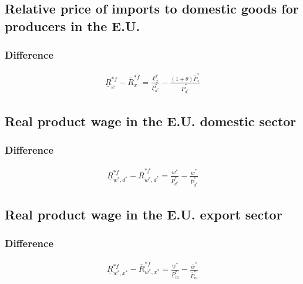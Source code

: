 \subsection*{Relative price of imports to domestic goods for producers in the E.U.}

\subsubsection*{Difference}
\begin{equation}\label{xproeu.diff}
\begin{aligned}
\underline R^{*f}_x - \overline R^{*f}_x = \frac{\underline P^*_x}{\underline P^*_{d^*}} - \frac{ \left( 1+\theta \right) \overline P^*_x}{\overline P^*_{d^*}}
\end{aligned}  
\end{equation}


\subsection*{Real product wage in the E.U. domestic sector}

\subsubsection*{Difference}
\begin{equation}\label{prodweu.diff} 
\begin{aligned}
\underline R^{*f}_{w^*, d^*} - \overline R^{*f}_{w^*, d^*} = \frac{\underline w^*}{\underline P^*_{d^*}} - \frac{\overline w^*}{\overline P^*_{d^*}}
\end{aligned}  
\end{equation}

\subsection*{Real product wage in the E.U. export sector}

\subsubsection*{Difference}
\begin{equation}\label{proxweu.diff}  
\begin{aligned}
\underline R^{*f}_{w^*, x^*} - \overline R^{*f}_{w^*, x^*} = \frac{\underline w^*}{\underline P^*_{m}} - \frac{\overline w^*}{\overline P^*_{m}}
\end{aligned}  
\end{equation}



